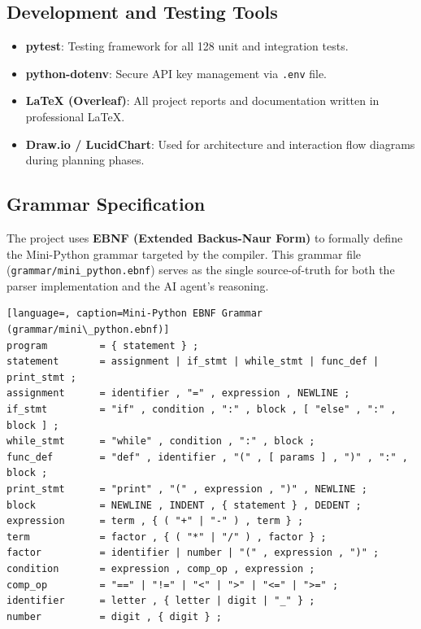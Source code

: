 \documentclass[a4paper,11pt]{article}
\begin{document}
\subsection{Development and Testing Tools}

\begin{itemize}
    \item \textbf{pytest}: Testing framework for all 128 unit and integration tests.
    \item \textbf{python-dotenv}: Secure API key management via \texttt{.env} file.
    \item \textbf{LaTeX (Overleaf)}: All project reports and documentation written in professional LaTeX.
    \item \textbf{Draw.io / LucidChart}: Used for architecture and interaction flow diagrams during planning phases.
\end{itemize}

\subsection{Grammar Specification}

The project uses \textbf{EBNF (Extended Backus-Naur Form)} to formally define the Mini-Python grammar targeted by the compiler. This grammar file (\texttt{grammar/mini\_python.ebnf}) serves as the single source-of-truth for both the parser implementation and the AI agent's reasoning.

\begin{lstlisting}[language=, caption=Mini-Python EBNF Grammar (grammar/mini\_python.ebnf)]
program         = { statement } ;
statement       = assignment | if_stmt | while_stmt | func_def | print_stmt ;
assignment      = identifier , "=" , expression , NEWLINE ;
if_stmt         = "if" , condition , ":" , block , [ "else" , ":" , block ] ;
while_stmt      = "while" , condition , ":" , block ;
func_def        = "def" , identifier , "(" , [ params ] , ")" , ":" , block ;
print_stmt      = "print" , "(" , expression , ")" , NEWLINE ;
block           = NEWLINE , INDENT , { statement } , DEDENT ;
expression      = term , { ( "+" | "-" ) , term } ;
term            = factor , { ( "*" | "/" ) , factor } ;
factor          = identifier | number | "(" , expression , ")" ;
condition       = expression , comp_op , expression ;
comp_op         = "==" | "!=" | "<" | ">" | "<=" | ">=" ;
identifier      = letter , { letter | digit | "_" } ;
number          = digit , { digit } ;
\end{lstlisting}
\end{document}
